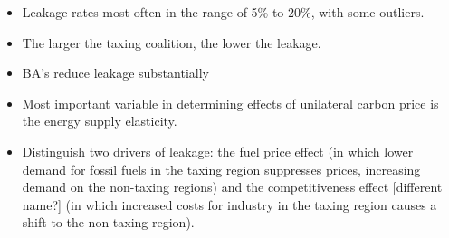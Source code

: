 \documentclass[notitlepage,12pt]{article}
\begin{document}
\begin{itemize}
\item Leakage rates most often in the range of 5\% to 20\%, with some
outliers.

\item The larger the taxing coalition, the lower the leakage.

\item BA's reduce leakage substantially

\item Most important variable in determining effects of unilateral carbon
price is the energy supply elasticity.

\item Distinguish two drivers of leakage: the fuel price effect (in which
lower demand for fossil fuels in the taxing region suppresses prices,
increasing demand on the non-taxing regions) and the competitiveness effect
[different name?] (in which increased costs for industry in the taxing
region causes a shift to the non-taxing region).
\end{itemize}
\end{document}
